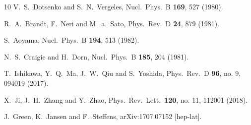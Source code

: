\documentclass[aps,prd,twocolumn,showpacs,preprintnumbers,superscriptaddress]{revtex4-1}
\begin{document}
\begin{thebibliography}{10}
  V.~S.~Dotsenko and S.~N.~Vergeles,
  Nucl.\ Phys.\ B {\bf 169}, 527 (1980).


  R.~A.~Brandt, F.~Neri and M.~a.~Sato,
  Phys.\ Rev.\ D {\bf 24}, 879 (1981).


  S.~Aoyama,
  Nucl.\ Phys.\ B {\bf 194}, 513 (1982).


  N.~S.~Craigie and H.~Dorn,
  Nucl.\ Phys.\ B {\bf 185}, 204 (1981).


  T.~Ishikawa, Y.~Q.~Ma, J.~W.~Qiu and S.~Yoshida,
  Phys.\ Rev.\ D {\bf 96}, no. 9, 094019 (2017).


  X.~Ji, J.~H.~Zhang and Y.~Zhao,
  Phys.\ Rev.\ Lett.\  {\bf 120}, no. 11, 112001 (2018).


  J.~Green, K.~Jansen and F.~Steffens,
  arXiv:1707.07152 [hep-lat].



\end{thebibliography}
\end{document}
